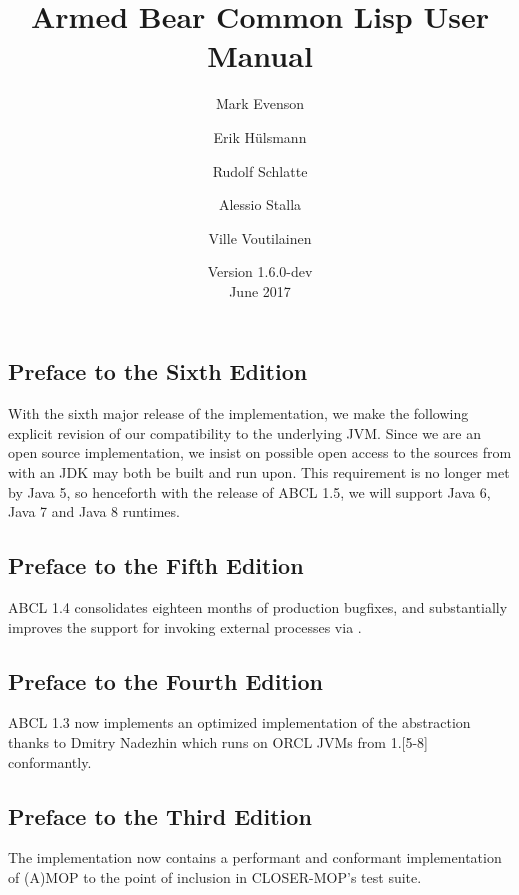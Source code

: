 \documentclass[10pt]{book}
\begin{document}
\title{Armed Bear Common Lisp User Manual}
\date{Version 1.6.0-dev\\
\smallskip
June 2017}
\author{Mark Evenson \and Erik H\"{u}lsmann \and Rudolf Schlatte \and
  Alessio Stalla \and Ville Voutilainen}

\maketitle

\tableofcontents
\subsection{Preface to the Sixth Edition}

With the sixth major release of the implementation, we make the
following explicit revision of our compatibility to the underlying
JVM.  Since we are an open source implementation, we insist on
possible open access to the sources from with an JDK may both be built
and run upon.  This requirement is no longer met by Java 5, so
henceforth with the release of \textsc{ABCL} 1.5, we will support
Java 6, Java 7 and Java 8 runtimes.


\subsection{Preface to the Fifth Edition}

\textsc{ABCL} 1.4 consolidates eighteen months of production bugfixes,
and substantially improves the support for invoking external
processes via .

\subsection{Preface to the Fourth Edition}

\textsc{ABCL} 1.3 now implements an optimized implementation of the
 abstraction thanks to Dmitry
Nadezhin which runs on ORCL JVMs from 1.[5-8] conformantly.

\subsection{Preface to the Third Edition}
The implementation now contains a performant and conformant
implementation of (A)MOP to the point of inclusion in CLOSER-MOP's
test suite.
\end{document}
